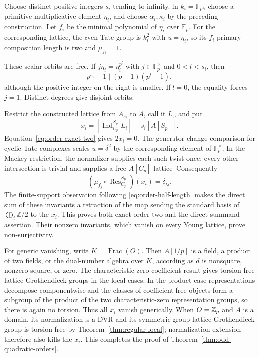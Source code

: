 Choose distinct positive integers $s_i$ tending to infinity.  In
$k_i=\mathbb F_{p^{s_i}}$ choose a primitive multiplicative element
$\eta_i$, and choose $\alpha_i,\kappa_i$ by the preceding construction.
Let $f_i$ be the
minimal polynomial of $\eta_i$ over $\mathbb F_p$.
For the corresponding lattice, the even Tate group is $k_i^2$ with
$u=\eta_i$, so its $f_i$-primary composition length is two and
$\mu_{f_i}=1$.

These scalar orbits are free.  If
$j\eta_i=\eta_i^{p^l}$ with $j\in\mathbb F_p^\times$ and
$0<l<s_i$, then
\[
 p^{s_i}-1\mid(p-1)(p^l-1),
\]
although the positive integer on the right is smaller.  If $l=0$,
the equality forces $j=1$.  Distinct degrees give disjoint orbits.

Restrict the constructed lattice from $A_{s_i}$ to $A$, call it $L_i$,
and put
\[
 x_i=[\operatorname{Ind}_{C_p}^{S_p}L_i]-s_i[A[S_p]].
\]
Equation~\eqref{eq:order-exact-two} gives $2x_i=0$.
The generator-change comparison for cyclic Tate complexes scales
$u=\delta^2$ by the corresponding element of $\mathbb F_p^\times$.
In the Mackey restriction, the normalizer supplies each such twist
once; every other intersection is trivial and supplies a free
$A[C_p]$-lattice.  Consequently
\[
 (\mu_{f_j}\circ\operatorname{Res}_{C_p}^{S_p})(x_i)=\delta_{ij}.
\]
The finite-support observation following
\eqref{eq:order-half-length} makes the direct sum of these invariants
a retraction of the map sending the standard basis of
$\bigoplus_i\mathbb Z/2$ to the $x_i$.  This proves both exact order
two and the direct-summand assertion.  Their nonzero invariants,
which vanish on every Young lattice, prove non-surjectivity.

For generic vanishing, write $K=\operatorname{Frac}(O)$.
Then $A[1/p]$ is a field, a product of two fields,
or the dual-number algebra over $K$, according as $d$ is
nonsquare, nonzero square, or zero.  The characteristic-zero
coefficient result gives torsion-free lattice Grothendieck groups
in the local cases.  In the product case representations decompose
componentwise and the classes of coefficient-free objects form a
subgroup of the product of the two characteristic-zero representation
groups, so there is again no torsion.  Thus all $x_i$ vanish generically.
When $O=\mathbb Z_p$ and $A$ is a domain, its normalization is a DVR and its
symmetric-group lattice Grothendieck group is torsion-free by
Theorem~\ref{thm:regular-local}; normalization extension therefore also
kills the $x_i$.  This completes the proof of
Theorem~\ref{thm:odd-quadratic-orders}.

